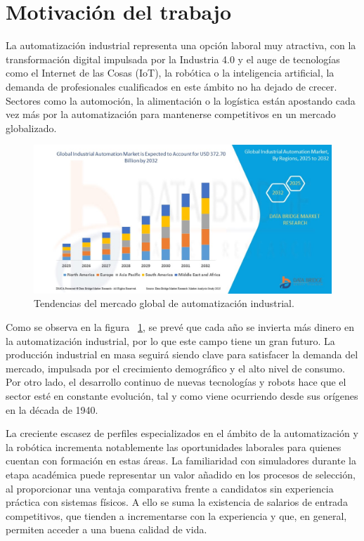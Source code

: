 \section{Motivación del trabajo}
\label{sec:cuartaseccion}

La automatización industrial representa una opción laboral muy atractiva, con la transformación digital impulsada por la Industria 4.0 y el auge de tecnologías como el Internet de las Cosas (IoT), la robótica o la inteligencia artificial, la demanda de profesionales cualificados en este ámbito no ha dejado de crecer. Sectores como la automoción, la alimentación o la logística están apostando cada vez más por la automatización para mantenerse competitivos en un mercado globalizado.

\newpage

\begin{figure} [h!]
  \begin{center}
    \includegraphics[width=15cm]{figs/grafico_futuro}
  \end{center}
  \caption{\centering Tendencias del mercado global de automatización industrial. \cite{grafico_empleabilidad}}
  \label{fig:grafico_futuro}
\end{figure} 

Como se observa en la figura  ~\ref{fig:grafico_futuro}, se prevé que cada año se invierta más dinero en la automatización industrial,
por lo que este campo tiene un gran futuro. La producción industrial en masa seguirá siendo clave para satisfacer la demanda del mercado, impulsada por el crecimiento demográfico y el alto nivel de consumo. Por otro lado, el desarrollo continuo de nuevas tecnologías y robots hace que el sector esté en constante evolución, tal y como viene ocurriendo desde sus orígenes en la década de 1940.

La creciente escasez de perfiles especializados en el ámbito de la automatización y la robótica incrementa notablemente las oportunidades laborales para quienes cuentan con formación en estas áreas. La familiaridad con simuladores durante la etapa académica puede representar un valor añadido en los procesos de selección, al proporcionar una ventaja comparativa frente a candidatos sin experiencia práctica con sistemas físicos. A ello se suma la existencia de salarios de entrada competitivos, que tienden a incrementarse con la experiencia y que, en general, permiten acceder a una buena calidad de vida.

